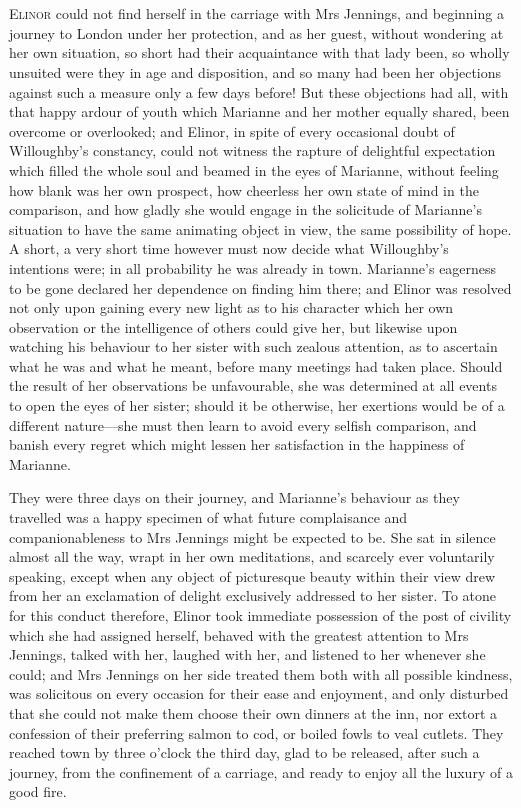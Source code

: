 \chapter[Chapter \thechapter]{}
\lettrine[lines=4,lraise=0.3]{E}{linor} could not find herself in the carriage with Mrs Jennings, and beginning a journey to London under her protection, and as her guest, without wondering at her own situation, so short had their acquaintance with that lady been, so wholly unsuited were they in age and disposition, and so many had been her objections against such a measure only a few days before! But these objections had all, with that happy ardour of youth which Marianne and her mother equally shared, been overcome or overlooked; and Elinor, in spite of every occasional doubt of Willoughby’s constancy, could not witness the rapture of delightful expectation which filled the whole soul and beamed in the eyes of Marianne, without feeling how blank was her own prospect, how cheerless her own state of mind in the comparison, and how gladly she would engage in the solicitude of Marianne’s situation to have the same animating object in view, the same possibility of hope. A short, a very short time however must now decide what Willoughby’s intentions were; in all probability he was already in town. Marianne’s eagerness to be gone declared her dependence on finding him there; and Elinor was resolved not only upon gaining every new light as to his character which her own observation or the intelligence of others could give her, but likewise upon watching his behaviour to her sister with such zealous attention, as to ascertain what he was and what he meant, before many meetings had taken place. Should the result of her observations be unfavourable, she was determined at all events to open the eyes of her sister; should it be otherwise, her exertions would be of a different nature—she must then learn to avoid every selfish comparison, and banish every regret which might lessen her satisfaction in the happiness of Marianne.

They were three days on their journey, and Marianne’s behaviour as they travelled was a happy specimen of what future complaisance and companionableness to Mrs Jennings might be expected to be. She sat in silence almost all the way, wrapt in her own meditations, and scarcely ever voluntarily speaking, except when any object of picturesque beauty within their view drew from her an exclamation of delight exclusively addressed to her sister. To atone for this conduct therefore, Elinor took immediate possession of the post of civility which she had assigned herself, behaved with the greatest attention to Mrs Jennings, talked with her, laughed with her, and listened to her whenever she could; and Mrs Jennings on her side treated them both with all possible kindness, was solicitous on every occasion for their ease and enjoyment, and only disturbed that she could not make them choose their own dinners at the inn, nor extort a confession of their preferring salmon to cod, or boiled fowls to veal cutlets. They reached town by three o’clock the third day, glad to be released, after such a journey, from the confinement of a carriage, and ready to enjoy all the luxury of a good fire.

